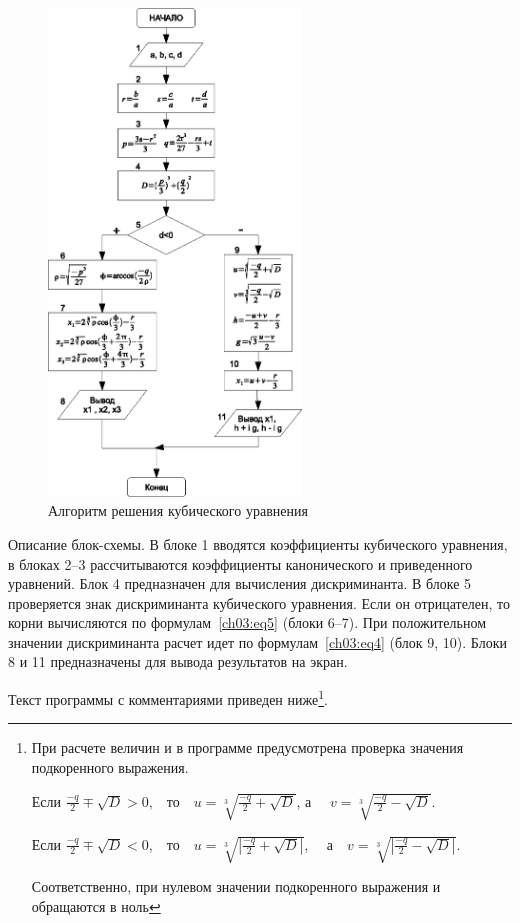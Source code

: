\begin{figure}[htb]
\begin{center}
\includegraphics[width=0.6\textwidth]{img/ris_3_19}
\caption{Алгоритм решения кубического уравнения}
\label{ch03:refDrawing18}
\end{center}
\end{figure}

Описание блок-схемы. В блоке 1 вводятся коэффициенты кубического уравнения, в блоках 2--3 рассчитываются коэффициенты
канонического и приведенного уравнений. Блок 4 предназначен для вычисления дискриминанта. В блоке 5 проверяется знак
дискриминанта кубического уравнения. Если он отрицателен, то корни вычисляются по формулам~\ref{ch03:eq5} (блоки 6--7). При
положительном значении дискриминанта расчет идет по формулам~\ref{ch03:eq4} (блок 9, 10). Блоки 8 и 11 предназначены для вывода результатов на экран.

Текст программы с комментариями приведен ниже\footnote{При расчете величин  и  в
программе предусмотрена проверка значения подкоренного выражения. 

Если  $\frac{-q}{2}\mp\sqrt{D}>0$,\ \ то\ \ $u=\sqrt[{3}]{\frac{-q}{2}+\sqrt{D}}$, 
а \ \ $v=\sqrt[{3}]{\frac{-q}{2}-\sqrt{D}}$.

Если  $\frac{-q}{2}\mp\sqrt{D}<0$,\ \ то\ \ $u=\sqrt[{3}]{|\frac{-q}{2}+\sqrt{D}|}$,
\ \  а\ \ $v=\sqrt[{3}]{|\frac{-q}{2}-\sqrt{D}|}$.

Соответственно, при нулевом значении подкоренного выражения  и  обращаются
в ноль}.

